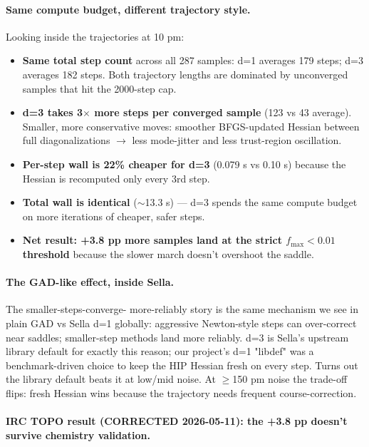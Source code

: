 \documentclass[11pt]{article}
\begin{document}
\paragraph{Same compute budget, different trajectory style.}
Looking inside the trajectories at 10 pm:

\begin{itemize}[leftmargin=1.5em, itemsep=0.05em]
\item \textbf{Same total step count} across all 287 samples: d=1 averages
  179 steps; d=3 averages 182 steps. Both trajectory lengths are
  dominated by unconverged samples that hit the 2000-step cap.
\item \textbf{d=3 takes 3$\times$ more steps per converged sample}
  (123 vs 43 average). Smaller, more conservative moves: smoother
  BFGS-updated Hessian between full diagonalizations $\to$ less
  mode-jitter and less trust-region oscillation.
\item \textbf{Per-step wall is 22\% cheaper for d=3} (0.079 s vs
  0.10 s) because the Hessian is recomputed only every 3rd step.
\item \textbf{Total wall is identical} ($\sim$13.3 s) — d=3 spends
  the same compute budget on more iterations of cheaper, safer
  steps.
\item \textbf{Net result: +3.8 pp more samples land at the strict
  $f_\text{max}<0.01$ threshold} because the slower march doesn't
  overshoot the saddle.
\end{itemize}

\paragraph{The GAD-like effect, inside Sella.} The smaller-steps-converge-
more-reliably story is the same mechanism we see in plain GAD vs
Sella d=1 globally: aggressive Newton-style steps can over-correct
near saddles; smaller-step methods land more reliably. d=3 is Sella's
upstream library default for exactly this reason; our project's
d=1 "libdef" was a benchmark-driven choice to keep the HIP Hessian
fresh on every step. Turns out the library default beats it at low/mid
noise. At $\ge$150 pm noise the trade-off flips: fresh Hessian wins
because the trajectory needs frequent course-correction.

\paragraph{IRC TOPO result (CORRECTED 2026-05-11): the +3.8 pp doesn't survive chemistry validation.}
\end{document}
